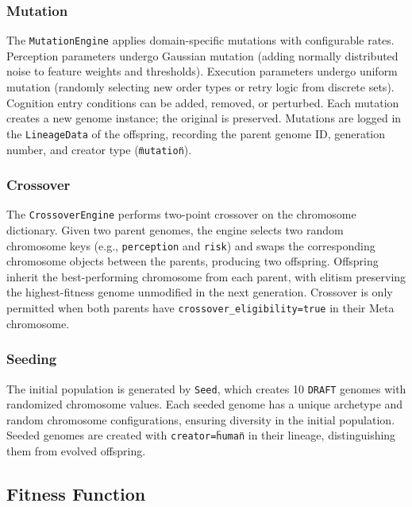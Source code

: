 \subsubsection{Mutation}

The \texttt{MutationEngine} applies domain-specific mutations with configurable rates. Perception parameters undergo Gaussian mutation (adding normally distributed noise to feature weights and thresholds). Execution parameters undergo uniform mutation (randomly selecting new order types or retry logic from discrete sets). Cognition entry conditions can be added, removed, or perturbed. Each mutation creates a new genome instance; the original is preserved. Mutations are logged in the \texttt{LineageData} of the offspring, recording the parent genome ID, generation number, and creator type (\texttt{\"mutation\"}).

\subsubsection{Crossover}

The \texttt{CrossoverEngine} performs two-point crossover on the chromosome dictionary. Given two parent genomes, the engine selects two random chromosome keys (e.g., \texttt{perception} and \texttt{risk}) and swaps the corresponding chromosome objects between the parents, producing two offspring. Offspring inherit the best-performing chromosome from each parent, with elitism preserving the highest-fitness genome unmodified in the next generation. Crossover is only permitted when both parents have \texttt{crossover\_eligibility=true} in their Meta chromosome.

\subsubsection{Seeding}

The initial population is generated by \texttt{Seed}, which creates 10 \texttt{DRAFT} genomes with randomized chromosome values. Each seeded genome has a unique archetype and random chromosome configurations, ensuring diversity in the initial population. Seeded genomes are created with \texttt{creator=\"human\"} in their lineage, distinguishing them from evolved offspring.

\subsection{Fitness Function}

